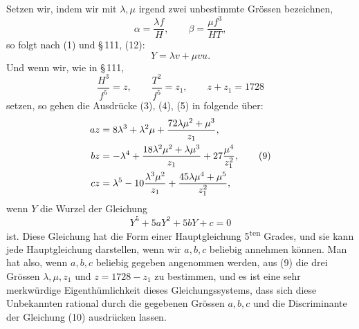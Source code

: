 \documentclass[11pt]{article}
\begin{document}
Setzen wir, indem wir mit \(\lambda,\mu\) irgend zwei unbestimmte Grössen bezeichnen,
\begin{equation}
\alpha=\frac{\lambda f}{H},
\qquad
\beta=\frac{\mu f^3}{HT},
\tag{6}
\end{equation}
so folgt nach (1) und \S\,111, (12):
\begin{equation}
Y=\lambda v+\mu vu.
\tag{7}
\end{equation}
Und wenn wir, wie in \S\,111,
\begin{equation}
\frac{H^3}{f^5}=z,
\qquad
\frac{T^2}{f^5}=z_1,
\qquad
z+z_1=1728
\tag{8}
\end{equation}
setzen, so gehen die Ausdrücke (3), (4), (5) in folgende über:
\begin{align}
az&=8\lambda^3+\lambda^2\mu+\frac{72\lambda\mu^2+\mu^3}{z_1},\notag\\
bz&=-\lambda^4+\frac{18\lambda^2\mu^2+\lambda\mu^3}{z_1}+27\frac{\mu^4}{z_1^2},\tag{9}\\
cz&=\lambda^5-10\frac{\lambda^3\mu^2}{z_1}+\frac{45\lambda\mu^4+\mu^5}{z_1^2},\notag
\end{align}
wenn \(Y\) die Wurzel der Gleichung
\begin{equation}
Y^5+5aY^2+5bY+c=0
\tag{10}
\end{equation}
ist. Diese Gleichung hat die Form einer Hauptgleichung 5\textsuperscript{ten} Grades, und sie kann jede Hauptgleichung darstellen, wenn wir \(a,b,c\) beliebig annehmen können. Man hat also, wenn \(a,b,c\) beliebig gegeben angenommen werden, aus (9) die drei Grössen \(\lambda,\mu,z_1\) und \(z=1728-z_1\) zu bestimmen, und es ist eine sehr merkwürdige Eigenthümlichkeit dieses Gleichungssystems, dass sich diese Unbekannten rational durch die gegebenen Grössen \(a,b,c\) und die Discriminante der Gleichung (10) ausdrücken lassen.
\end{document}
